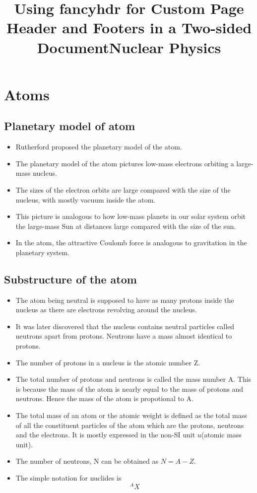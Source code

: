 \documentclass[12pt]{book}
\title{Using fancyhdr for Custom Page Header and Footers in a Two-sided Document}
\begin{document}
\setcounter{secnumdepth}{0}

\title{Nuclear Physics}
\maketitle
\tableofcontents
\newpage

\setcounter{page}{1}
\graphicspath{ {../} }
\chapter{Atoms}
\section{Planetary model of atom}
\begin{itemize}
	\item Rutherford proposed the planetary model of the atom.
	\item The planetary model of the atom pictures low-mass electrons orbiting a large-mass nucleus.
	\item The sizes of the electron orbits are large compared with the size of the nucleus, with mostly vacuum inside the atom.
	\item This picture is analogous to how low-mass planets in our solar system orbit the large-mass Sun at distances large compared with the size of the sun.
	\item In the atom, the attractive Coulomb force is analogous to gravitation in the planetary system.
\end{itemize}
\section{Substructure of the atom}
\begin{itemize}
	\item The atom being neutral is supposed to have as many protons inside the nucleus as there are electrons revolving around the nucleus.
	\item  It  was later discovered that the nucleus contains neutral particles called neutrons apart from protons. Neutrons have a mass almost identical to protons.
	\item The number of protons in a nucleus is the atomic number Z.
	\item The total number of protons and neutrons is called the mass number A. This is because the mass of the atom is nearly equal to the mass of protons and neutrons. Hence the mass of the atom is propotional to A.
	\item The total mass of an atom or the atomic weight is defined as the total mass of all the constituent particles of the atom which are the protons, neutrons and the electrons. It is mostly expressed in the non-SI unit $u$(atomic mass unit).
	\item The number of neutrons, N can be obtained as $N = A-Z$.
	\item The simple notation for nuclides is $$ ^AX $$
\end{itemize}
\end{document}
